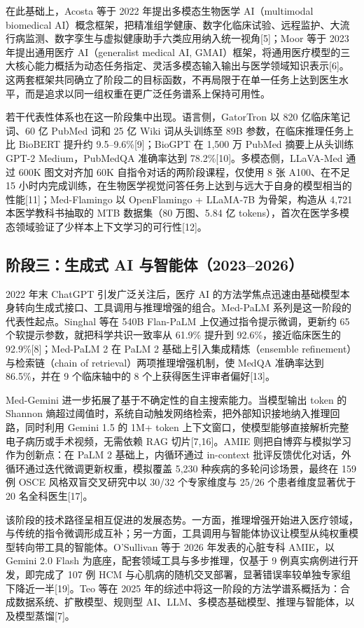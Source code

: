 在此基础上，Acosta 等于 2022 年提出多模态生物医学 AI（multimodal biomedical AI）概念框架，把精准组学健康、数字化临床试验、远程监护、大流行病监测、数字孪生与虚拟健康助手六类应用纳入统一视角[5]；Moor 等于 2023 年提出通用医疗 AI（generalist medical AI, GMAI）框架，将通用医疗模型的三大核心能力概括为动态任务指定、灵活多模态输入输出与医学领域知识表示[6]。这两套框架共同确立了阶段二的目标函数，不再局限于在单一任务上达到医生水平，而是追求以同一组权重在更广泛任务谱系上保持可用性。

若干代表性体系也在这一阶段集中出现。语言侧，GatorTron 以 820 亿临床笔记词、60 亿 PubMed 词和 25 亿 Wiki 词从头训练至 89B 参数，在临床推理任务上比 BioBERT 提升约 9.5--9.6\%[9]；BioGPT 在 1,500 万 PubMed 摘要上从头训练 GPT-2 Medium，PubMedQA 准确率达到 78.2\%[10]。多模态侧，LLaVA-Med 通过 600K 图文对齐加 60K 自指令对话的两阶段课程，仅使用 8 张 A100、在不足 15 小时内完成训练，在生物医学视觉问答任务上达到与远大于自身的模型相当的性能[11]；Med-Flamingo 以 OpenFlamingo + LLaMA-7B 为骨架，构造从 4,721 本医学教科书抽取的 MTB 数据集（80 万图、5.84 亿 tokens），首次在医学多模态领域验证了少样本上下文学习的可行性[12]。

\subsection{阶段三：生成式 AI 与智能体（2023--2026）}

2022 年末 ChatGPT 引发广泛关注后，医疗 AI 的方法学焦点迅速由基础模型本身转向生成式接口、工具调用与推理增强的组合。Med-PaLM 系列是这一阶段的代表性起点。Singhal 等在 540B Flan-PaLM 上仅通过指令提示微调，更新约 65 个软提示参数，就把科学共识一致率从 61.9\% 提升到 92.6\%，接近临床医生的 92.9\%[8]；Med-PaLM 2 在 PaLM 2 基础上引入集成精炼（ensemble refinement）与检索链（chain of retrieval）两项推理增强机制，使 MedQA 准确率达到 86.5\%，并在 9 个临床轴中的 8 个上获得医生评审者偏好[13]。

Med-Gemini 进一步拓展了基于不确定性的自主搜索能力。当模型输出 token 的 Shannon 熵超过阈值时，系统自动触发网络检索，把外部知识接地纳入推理回路，同时利用 Gemini 1.5 的 1M+ token 上下文窗口，使模型能够直接解析完整电子病历或手术视频，无需依赖 RAG 切片[7,16]。AMIE 则把自博弈与模拟学习作为创新点：在 PaLM 2 基础上，内循环通过 in-context 批评反馈优化对话，外循环通过迭代微调更新权重，模拟覆盖 5,230 种疾病的多轮问诊场景，最终在 159 例 OSCE 风格双盲交叉研究中以 30/32 个专家维度与 25/26 个患者维度显著优于 20 名全科医生[17]。

该阶段的技术路径呈相互促进的发展态势。一方面，推理增强开始进入医疗领域，与传统的指令微调形成互补；另一方面，工具调用与智能体协议让模型从纯权重模型转向带工具的智能体。O'Sullivan 等于 2026 年发表的心脏专科 AMIE，以 Gemini 2.0 Flash 为底座，配套领域工具与多步推理，仅基于 9 例真实病例进行开发，即完成了 107 例 HCM 与心肌病的随机交叉部署，显著错误率较单独专家组下降近一半[19]。Teo 等在 2025 年的综述中将这一阶段的方法学谱系概括为：合成数据系统、扩散模型、规则型 AI、LLM、多模态基础模型、推理与智能体，以及模型蒸馏[7]。

